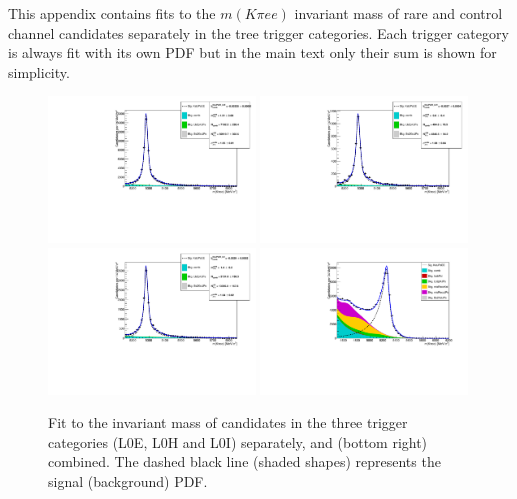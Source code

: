 This appendix contains fits to the $m(K\pi ee )$ invariant mass of rare and control channel
candidates separately in the tree trigger categories. Each trigger category is always fit
with its own PDF but in the main text only their sum is shown for simplicity.

\begin{figure}[h!]
\centering
\includegraphics[width=0.49\textwidth]{RKst/figs/Fit/fit_EE/KstJPsEE_L0E.pdf}
\includegraphics[width=0.49\textwidth]{RKst/figs/Fit/fit_EE/KstJPsEE_L0H.pdf}
\includegraphics[width=0.49\textwidth]{RKst/figs/Fit/fit_EE/KstJPsEE_L0I.pdf}
\includegraphics[width=0.49\textwidth]{RKst/figs/Fit/fit_EE/fit_JPs.pdf}
\caption{Fit to the \mKpiee invariant mass of \BdToKstJPsee candidates in the three trigger categories (L0E, L0H and L0I) separately, and (bottom right) combined. The dashed black line (shaded shapes) represents the signal (background) PDF.}
\label{fig:fitJPs_control_EE}
\end{figure}
